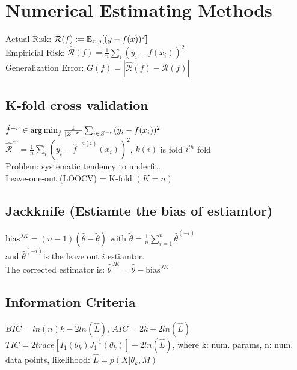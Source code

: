 \section{Numerical Estimating Methods}
Actual Risk: $\mathcal{R}(f) := \mathbb{E}_{x,y}[(y-f(x))^2]$ \\
Empiricial Risk: $\hat{\mathcal{R}}(f) = \frac{1}{n}\sum_i (y_i - f(x_i))^2$\\
Generalization Error: $G(f) = |\hat{\mathcal{R}}(f) - \mathcal{R}(f)|$
\subsection*{K-fold cross validation}
$\hat{f}^{-\nu} \in \operatorname*{arg\,min}_f \frac{1}{|Z^{-\nu}|} \sum_{i \in Z^{-\nu}} (y_i - f(x_i))^2$\\
$\hat{\mathcal{R}}^{cv} = \frac{1}{n} \sum_i(y_i - \hat{f}^{-\kappa(i)}(x_i))^2$, $k(i)$ is fold $i^{th}$ fold \\
Problem: systematic tendency to underfit.\\
Leave-one-out (LOOCV) = K-fold $(K=n)$
\subsection*{Jackknife (Estiamte the bias of estiamtor)}
$\text{bias}^{JK} = (n-1)(\hat\theta - \tilde{\theta})$ with
$\tilde{\theta}=\frac{1}{n}\sum_{i=1}^n\hat{\theta}^{(-i)}$\\
and $\hat{\theta}^{(-i)}$is the leave out $i$ estiamtor.\\
The corrected estimator is: $\hat{\theta}^{JK} = \hat{\theta} - \text{bias}^{JK}$
\subsection*{Information Criteria}
$BIC = ln(n)k - 2ln(\hat{L})$, $AIC = 2k - 2ln(\hat{L})$\\
$TIC = 2trace[I_1(\theta_k)J_1^{-1}(\theta_k)] - 2ln(\hat{L})$, 
where k: num. params, n: num. data points, likelihood: $\hat{L}=p(X|\theta_k,M)$  